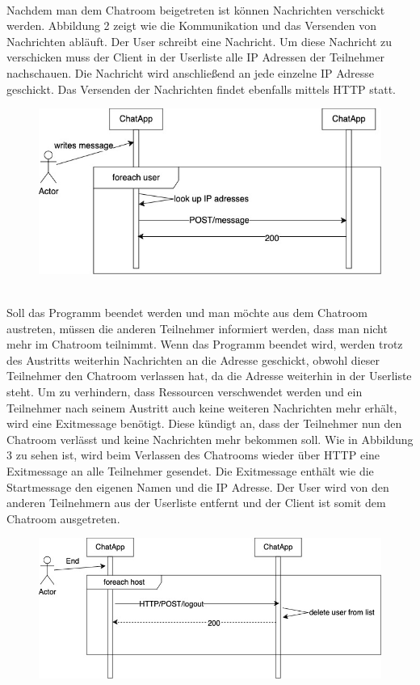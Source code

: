 \\
Nachdem man dem Chatroom beigetreten ist können Nachrichten verschickt werden. Abbildung 2 zeigt wie die Kommunikation und das Versenden von Nachrichten abläuft.
Der User schreibt eine Nachricht. 
Um diese Nachricht zu verschicken muss der Client in der Userliste alle IP Adressen der Teilnehmer nachschauen. Die Nachricht wird anschließend 
an jede einzelne IP Adresse geschickt. Das Versenden der Nachrichten findet ebenfalls mittels HTTP statt.
\begin{figure}[h]
    \centering
    \includegraphics[scale=0.4]{Images/Kommunikation_Sequenzdiagramm.jpg}
\end{figure}
\\
Soll das Programm beendet werden und man möchte aus dem Chatroom austreten, müssen die anderen Teilnehmer informiert werden, dass man nicht mehr im Chatroom teilnimmt.
Wenn das Programm beendet wird, werden trotz des Austritts weiterhin Nachrichten an die Adresse geschickt, obwohl dieser Teilnehmer den Chatroom verlassen hat, da die Adresse weiterhin in der Userliste steht.
Um zu verhindern, dass Ressourcen verschwendet werden und ein Teilnehmer nach seinem Austritt auch keine weiteren Nachrichten mehr erhält, wird eine Exitmessage benötigt. Diese kündigt an, dass der Teilnehmer nun 
den Chatroom verlässt und keine Nachrichten mehr bekommen soll. 
Wie in Abbildung 3 zu sehen ist, wird beim Verlassen des Chatrooms wieder über HTTP eine Exitmessage an alle Teilnehmer gesendet. Die Exitmessage enthält wie die Startmessage den eigenen Namen und die IP Adresse.
Der User wird von den anderen Teilnehmern aus der Userliste entfernt und der Client ist somit dem Chatroom ausgetreten. 
\begin{figure}[h]
    \centering
    \includegraphics[scale=0.4]{Images/Exit_Sequenzdiagramm.jpg}
\end{figure}
\newpage